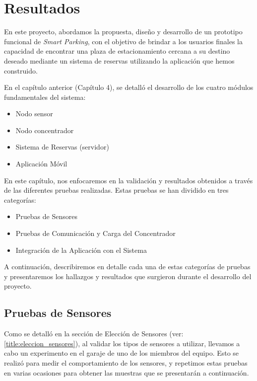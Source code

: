 \clearpage
\section{Resultados}{\label{title:resultados}}
En este proyecto, abordamos la propuesta, diseño y desarrollo de un prototipo funcional de \textit{Smart Parking}, con el objetivo de brindar a los usuarios finales la capacidad de encontrar una plaza de estacionamiento cercana a su destino deseado mediante un sistema de reservas utilizando la aplicación que hemos construido.

En el capítulo anterior (Capítulo 4), se detalló el desarrollo de los cuatro módulos fundamentales del sistema:

\begin{itemize}
    \item Nodo sensor
    \item Nodo concentrador
    \item Sistema de Reservas (servidor)
    \item Aplicación Móvil
\end{itemize}

En este capítulo, nos enfocaremos en la validación y resultados obtenidos a través de las diferentes pruebas realizadas. Estas pruebas se han dividido en tres categorías:
\begin{itemize}
    \item Pruebas de Sensores
    \item Pruebas de Comunicación y Carga del Concentrador
    \item Integración de la Aplicación con el Sistema
\end{itemize}

A continuación, describiremos en detalle cada una de estas categorías de pruebas y presentaremos los hallazgos y resultados que surgieron durante el desarrollo del proyecto.

\subsection{Pruebas de Sensores}\label{title:pruebas_sensores}

Como se detalló en la sección de Elección de Sensores (ver: \ref{title:eleccion_sensores}), al validar los tipos de sensores a utilizar, llevamos a cabo un experimento en el garaje de uno de los miembros del equipo. Esto se realizó para medir el comportamiento de los sensores, y repetimos estas pruebas en varias ocasiones para obtener las muestras que se presentarán a continuación.

